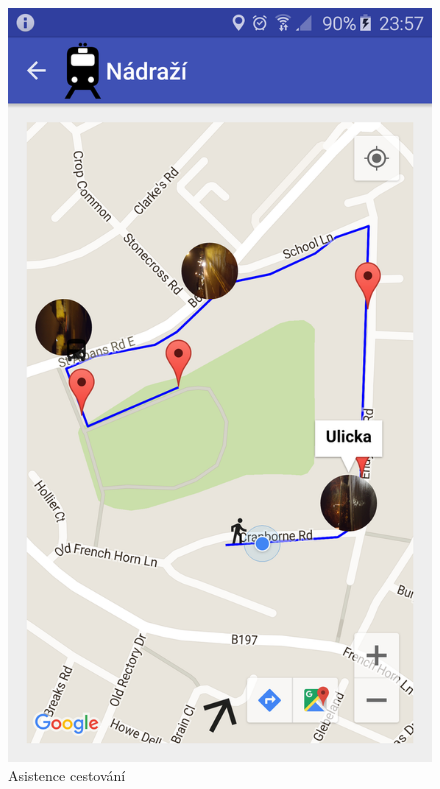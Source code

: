 \documentclass[czech,master,public,dept460,male,java,cpdeclaration]{diploma}
\begin{document}
\begin{figure}[H]
\begin{minipage}{.5\textwidth}
\centering
                \includegraphics[scale=0.14]{img/screen/asistencecestovani.png}
        \caption{Asistence cestování}
        \label{fig:asistence}
\end{minipage}
\begin{minipage}{.5\textwidth}
\centering

\end{minipage}
\end{figure}
\end{document}
